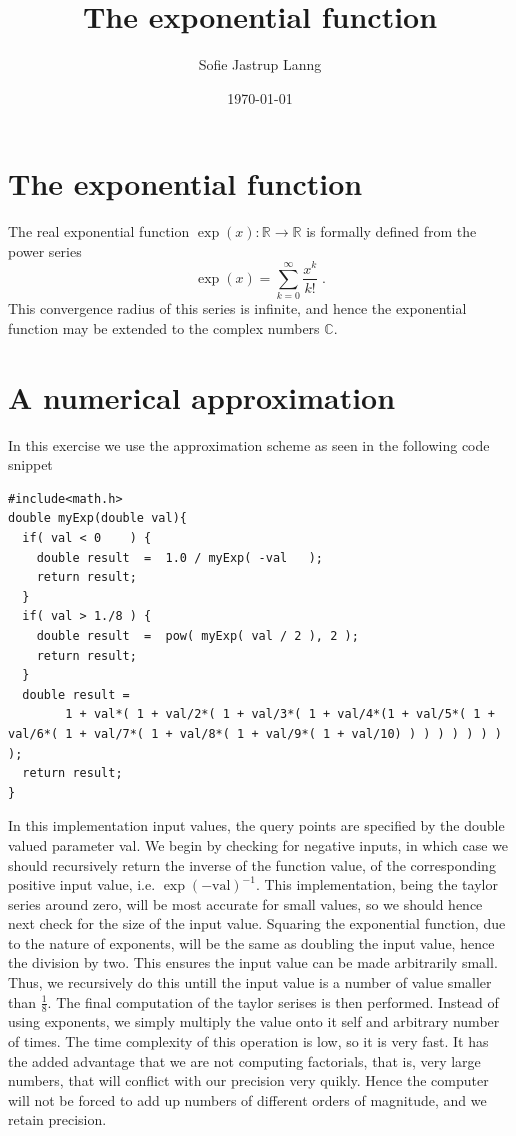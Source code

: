 \documentclass[twocolumn]{article}
\title{\textbf{The exponential function}}
\author{Sofie Jastrup Lanng}
\date{\today}
\begin{document}
\maketitle

\section{The exponential function}
The real exponential function $\exp(x): \mathbb{R}\rightarrow\mathbb{R}$ is formally defined from the power series
\begin{equation}\label{eq:power}
	\exp(x) = \sum_{k=0}^\infty \frac{x^k}{k!} \;.
\end{equation}
This convergence radius of this series is infinite, and hence the exponential function may be extended to the complex numbers $\mathbb{C}$.

\section{A numerical approximation}
In this exercise we use the approximation scheme as seen in the following code snippet

\begin{lstlisting}
#include<math.h>
double myExp(double val){
  if( val < 0    ) {
    double result  =  1.0 / myExp( -val   );
    return result;
  }
  if( val > 1./8 ) {
    double result  =  pow( myExp( val / 2 ), 2 );
    return result;
  }
  double result =
		1 + val*( 1 + val/2*( 1 + val/3*( 1 + val/4*(1 + val/5*( 1 + val/6*( 1 + val/7*( 1 + val/8*( 1 + val/9*( 1 + val/10) ) ) ) ) ) ) ) );
  return result;
}

\end{lstlisting}
In this implementation input values, the query points are specified by the double valued parameter val.
We begin by checking for negative inputs, in which case we should recursively return the inverse of the function value,
of the corresponding positive input value, i.e. $\exp \left( -\text{val} \right)^{-1}$. This implementation, being the taylor series around zero,
will be most accurate for small values, so we should hence next check for the size of the input value. Squaring the exponential function, due to the
nature of exponents, will be the same as doubling the input value, hence the division by two. This ensures the input value can be made arbitrarily
small. Thus, we recursively do this untill the input value is a number of value smaller than $\frac18$. The final computation of the taylor serises
is then performed. Instead of using exponents, we simply multiply the value onto it self and arbitrary number of times. The time complexity of this
operation is low, so it is very fast. It has the added advantage that we are not computing factorials, that is, very large numbers, that will conflict
with our precision very quikly. Hence the computer will not be forced to add up numbers of different orders of magnitude, and we retain precision.
\end{document}
